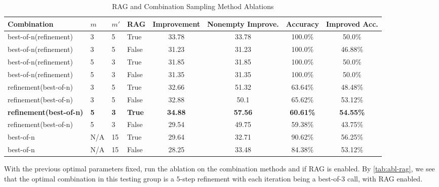 \begin{table}[h]
\caption{RAG and Combination Sampling Method Ablations}
\label{tab:abl-rag}
\centering
\small
\begin{tabular}{llll|cccc}
\toprule
Combination & $m$ & $m'$  & RAG & Improvement& Nonempty Improve.& Accuracy & Improved Acc.\\
\midrule
best-of-n(refinement) & 3 & 5 & True &  33.78 & 33.78 & 100.0\% & 50.0\% \\
best-of-n(refinement) & 3 & 5 & False &  31.23 & 31.23 & 100.0\% & 46.88\% \\
best-of-n(refinement) & 5 & 3 & True &  31.85 & 31.85 & 100.0\% & 50.0\% \\
best-of-n(refinement) & 5 & 3& False &  31.35 & 31.35 & 100.0\% & 50.0\% \\
refinement(best-of-n) & 3 & 5 & True &  32.66 & 51.32 & 63.64\% & 48.48\% \\
refinement(best-of-n) & 3 & 5 & False &  32.88 & 50.1 & 65.62\% & 53.12\% \\
\textbf{refinement(best-of-n)} & \textbf{5} & \textbf{3} & \textbf{True} &  \textbf{34.88} & \textbf{57.56} & \textbf{60.61\%} & \textbf{54.55\%} \\
refinement(best-of-n) & 5 & 3 & False &  29.54 & 49.75 & 59.38\% & 43.75\% \\
best-of-n & N/A & 15 & True &  29.64 & 32.71 & 90.62\% & 56.25\% \\
best-of-n & N/A & 15 & False &  28.25 & 33.48 & 84.38\% & 53.12\% \\
\bottomrule
\end{tabular}
\end{table}


With the previous optimal parameters fixed, run the ablation on the combination methods and if RAG is enabled. By \autoref{tab:abl-rag}, we see that the optimal combination in this testing group is a $5$-step refinement with each iteration being a best-of-3 call, with RAG enabled.



